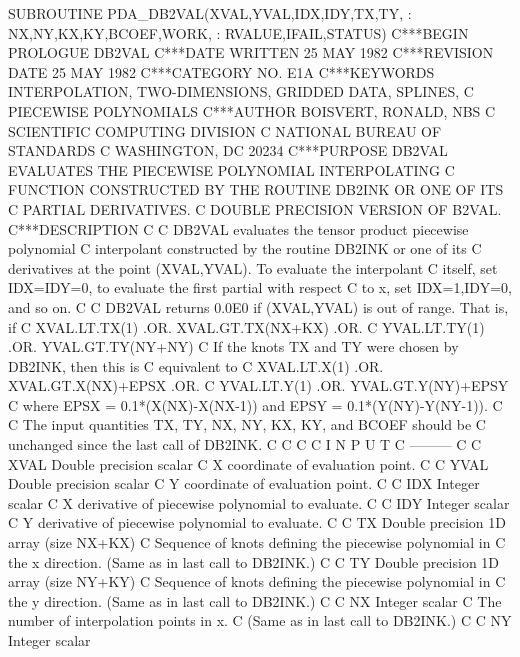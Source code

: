 \documentclass[11pt,twoside,nolof]{starlink}
\begin{document}
\begin{terminalv}
     SUBROUTINE PDA_DB2VAL(XVAL,YVAL,IDX,IDY,TX,TY,
     :                      NX,NY,KX,KY,BCOEF,WORK,
     :                      RVALUE,IFAIL,STATUS)
C***BEGIN PROLOGUE  DB2VAL
C***DATE WRITTEN   25 MAY 1982
C***REVISION DATE  25 MAY 1982
C***CATEGORY NO.  E1A
C***KEYWORDS  INTERPOLATION, TWO-DIMENSIONS, GRIDDED DATA, SPLINES,
C             PIECEWISE POLYNOMIALS
C***AUTHOR  BOISVERT, RONALD, NBS
C             SCIENTIFIC COMPUTING DIVISION
C             NATIONAL BUREAU OF STANDARDS
C             WASHINGTON, DC 20234
C***PURPOSE  DB2VAL EVALUATES THE PIECEWISE POLYNOMIAL INTERPOLATING
C            FUNCTION CONSTRUCTED BY THE ROUTINE DB2INK OR ONE OF ITS
C            PARTIAL DERIVATIVES.
C            DOUBLE PRECISION VERSION OF B2VAL.
C***DESCRIPTION
C
C   DB2VAL  evaluates   the   tensor   product   piecewise   polynomial
C   interpolant constructed  by  the  routine  DB2INK  or  one  of  its
C   derivatives at the point (XVAL,YVAL). To evaluate  the  interpolant
C   itself, set IDX=IDY=0, to evaluate the first partial  with  respect
C   to x, set IDX=1,IDY=0, and so on.
C
C   DB2VAL returns 0.0E0 if (XVAL,YVAL) is out of range. That is, if
C            XVAL.LT.TX(1) .OR. XVAL.GT.TX(NX+KX) .OR.
C            YVAL.LT.TY(1) .OR. YVAL.GT.TY(NY+NY)
C   If the knots TX  and  TY  were  chosen  by  DB2INK,  then  this  is
C   equivalent to
C            XVAL.LT.X(1) .OR. XVAL.GT.X(NX)+EPSX .OR.
C            YVAL.LT.Y(1) .OR. YVAL.GT.Y(NY)+EPSY
C   where EPSX = 0.1*(X(NX)-X(NX-1)) and EPSY = 0.1*(Y(NY)-Y(NY-1)).
C
C   The input quantities TX, TY, NX, NY, KX, KY, and  BCOEF  should  be
C   unchanged since the last call of DB2INK.
C
C
C
C   I N P U T
C   ---------
C
C   XVAL    Double precision scalar
C           X coordinate of evaluation point.
C
C   YVAL    Double precision scalar
C           Y coordinate of evaluation point.
C
C   IDX     Integer scalar
C           X derivative of piecewise polynomial to evaluate.
C
C   IDY     Integer scalar
C           Y derivative of piecewise polynomial to evaluate.
C
C   TX      Double precision 1D array (size NX+KX)
C           Sequence of knots defining the piecewise polynomial in
C           the x direction.  (Same as in last call to DB2INK.)
C
C   TY      Double precision 1D array (size NY+KY)
C           Sequence of knots defining the piecewise polynomial in
C           the y direction.  (Same as in last call to DB2INK.)
C
C   NX      Integer scalar
C           The number of interpolation points in x.
C           (Same as in last call to DB2INK.)
C
C   NY      Integer scalar

\end{terminalv}
\end{document}
